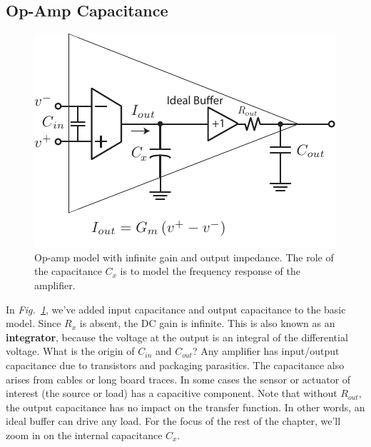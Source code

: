 \subsection{Op-Amp Capacitance}
\begin{figure}[tb]
\centering
\includegraphics[scale=1]{opamp_ota_model_cap}
\caption{Op-amp model with infinite gain and output impedance.  The role of the capacitance $C_x$ is to model the frequency response of the amplifier.}
\label{fig:opamp_ota_model_cap}
\end{figure}
In \emph{Fig.~\ref{fig:opamp_ota_model_cap}}, we've added input capacitance and output capacitance to the basic model.  Since $R_x$ is absent, the DC gain is infinite.  This is also known as an \textbf{integrator}, because the voltage at the output is an integral of the differential voltage.    
What is the origin of $C_{in}$ and $C_{out}$?  Any amplifier has input/output capacitance due to transistors and packaging parasitics.  The capacitance also arises from cables or long board traces.  In some cases the sensor or actuator of interest (the source or load) has a capacitive component. Note that without $R_{out}$, the output capacitance has no impact on the transfer function.  In other words, an ideal buffer can drive any load.  For the focus of the rest of the chapter, we'll zoom in on the internal capacitance $C_x$.
\newpage
